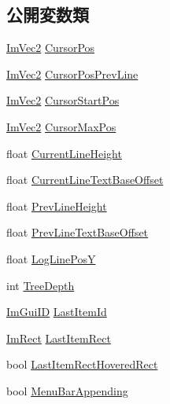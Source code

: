 \subsection*{公開変数類}
\begin{DoxyCompactItemize}
\item 
\mbox{\hyperlink{struct_im_vec2}{Im\+Vec2}} \mbox{\hyperlink{struct_im_gui_draw_context_a1f566246492e0995b5182de23633dc9a}{Cursor\+Pos}}
\item 
\mbox{\hyperlink{struct_im_vec2}{Im\+Vec2}} \mbox{\hyperlink{struct_im_gui_draw_context_adf64144a8421a21d7350d0452739eca2}{Cursor\+Pos\+Prev\+Line}}
\item 
\mbox{\hyperlink{struct_im_vec2}{Im\+Vec2}} \mbox{\hyperlink{struct_im_gui_draw_context_aef16fef5d6781908d806479fd37f393f}{Cursor\+Start\+Pos}}
\item 
\mbox{\hyperlink{struct_im_vec2}{Im\+Vec2}} \mbox{\hyperlink{struct_im_gui_draw_context_add16f0294ab2fd07b354da2bb99e43e1}{Cursor\+Max\+Pos}}
\item 
float \mbox{\hyperlink{struct_im_gui_draw_context_a950b71358ebfed5a884936f5cafed873}{Current\+Line\+Height}}
\item 
float \mbox{\hyperlink{struct_im_gui_draw_context_af6f0a3536765c5f638fd198749bf29f1}{Current\+Line\+Text\+Base\+Offset}}
\item 
float \mbox{\hyperlink{struct_im_gui_draw_context_ab4f6d19a049cff7a2fa5d1e9f5f132ab}{Prev\+Line\+Height}}
\item 
float \mbox{\hyperlink{struct_im_gui_draw_context_a72d618764e8a78c5bb7879ad2fe5e308}{Prev\+Line\+Text\+Base\+Offset}}
\item 
float \mbox{\hyperlink{struct_im_gui_draw_context_a4060735d06c860014c5359bcf76b1112}{Log\+Line\+PosY}}
\item 
int \mbox{\hyperlink{struct_im_gui_draw_context_a08d8578fe382425a67b4f5e5257b5436}{Tree\+Depth}}
\item 
\mbox{\hyperlink{imgui_8h_a1785c9b6f4e16406764a85f32582236f}{Im\+Gui\+ID}} \mbox{\hyperlink{struct_im_gui_draw_context_ad864847097dd259ce9cb69558173fe45}{Last\+Item\+Id}}
\item 
\mbox{\hyperlink{struct_im_rect}{Im\+Rect}} \mbox{\hyperlink{struct_im_gui_draw_context_a214683a9c08e5812a492881791cd2f51}{Last\+Item\+Rect}}
\item 
bool \mbox{\hyperlink{struct_im_gui_draw_context_ad6f4bf282ceef2a07cf25a59008feb16}{Last\+Item\+Rect\+Hovered\+Rect}}
\item 
bool \mbox{\hyperlink{struct_im_gui_draw_context_a01e52aff3f5efc13fcf6af213cf417c2}{Menu\+Bar\+Appending}}

\end{DoxyCompactItemize}
